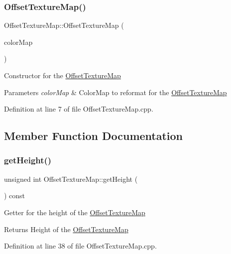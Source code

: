 \subsubsection{\texorpdfstring{Offset\+Texture\+Map()}{OffsetTextureMap()}}
{\footnotesize\ttfamily Offset\+Texture\+Map\+::\+Offset\+Texture\+Map (\begin{DoxyParamCaption}\item[{const \hyperlink{classglimac_1_1_color_map}{Color\+Map} \&}]{color\+Map }\end{DoxyParamCaption})\hspace{0.3cm}{\ttfamily [explicit]}}

Constructor for the \hyperlink{class_offset_texture_map}{Offset\+Texture\+Map} 
\begin{DoxyParams}{Parameters}
{\em color\+Map} & Color\+Map to reformat for the \hyperlink{class_offset_texture_map}{Offset\+Texture\+Map} \\
\hline
\end{DoxyParams}


Definition at line 7 of file Offset\+Texture\+Map.\+cpp.



\subsection{Member Function Documentation}
\mbox{\label{class_offset_texture_map_a8b02667e403b0a21e817e844a01b8dd4}} 
\subsubsection{\texorpdfstring{get\+Height()}{getHeight()}}
{\footnotesize\ttfamily unsigned int Offset\+Texture\+Map\+::get\+Height (\begin{DoxyParamCaption}{ }\end{DoxyParamCaption}) const}

Getter for the height of the \hyperlink{class_offset_texture_map}{Offset\+Texture\+Map} \begin{DoxyReturn}{Returns}
Height of the \hyperlink{class_offset_texture_map}{Offset\+Texture\+Map} 
\end{DoxyReturn}


Definition at line 38 of file Offset\+Texture\+Map.\+cpp.

